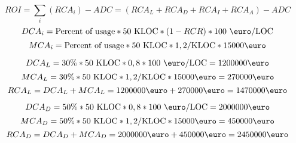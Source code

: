\documentclass[a4paper,12pt,oneside]{scrreprt}
\begin{document}
\begin{table}[h]
    \centering
\end{table}

\begin{equation*}
ROI = \sum_i(RCA_i) - ADC = (RCA_L + RCA_D + RCA_I + RCA_A) - ADC
\end{equation*}
\begin{equation*}
DCA_i = \text{Percent of usage} * 50 \text{ KLOC} * (1 - RCR) * 100 \text{ \euro/LOC}
\end{equation*}
\begin{equation*}
MCA_i = \text{Percent of usage} * 50 \text{ KLOC} * 1,2/\text{KLOC} * 15000\text{\euro}
\end{equation*}

\begin{equation*}
DCA_L = 30\% * 50 \text{ KLOC} * 0,8 * 100\text{ \euro/LOC} = 1200000 \text{\euro}
\end{equation*}
\begin{equation*}
MCA_L = 30\% * 50 \text{ KLOC} * 1,2/\text{KLOC} * 15000\text{\euro} = 270000\text{\euro}
\end{equation*}
\begin{equation*}
RCA_L = DCA_L + MCA_L = 1200000\text{\euro} + 270000\text{\euro} = 1470000\text{\euro}
\end{equation*}

\begin{equation*}
DCA_D = 50\% * 50 \text{ KLOC} * 0,8 * 100\text{ \euro/LOC} = 2000000 \text{\euro}
\end{equation*}
\begin{equation*}
MCA_D = 50\% * 50 \text{ KLOC} * 1,2/\text{KLOC} * 15000\text{\euro} = 450000\text{\euro}
\end{equation*}
\begin{equation*}
RCA_D = DCA_D + MCA_D = 2000000\text{\euro} + 450000\text{\euro} = 2450000\text{\euro}
\end{equation*}
\end{document}
